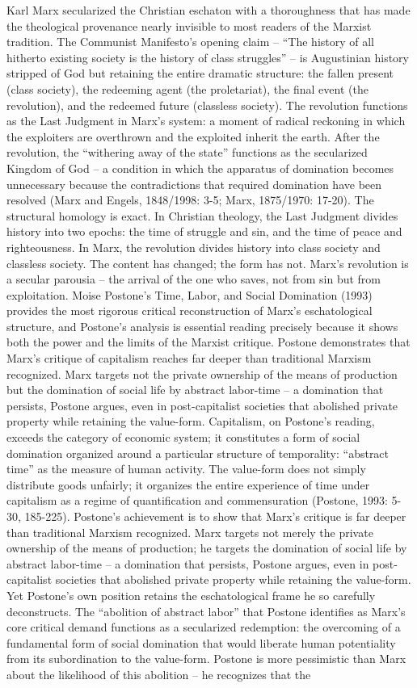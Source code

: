 Karl Marx secularized the Christian eschaton with a thoroughness that has made the theological provenance nearly invisible to most readers of the Marxist tradition. The Communist Manifesto’s opening claim – “The history of all hitherto existing society is the history of class struggles” – is Augustinian history stripped of God but retaining the entire dramatic structure: the fallen present (class society), the redeeming agent (the proletariat), the final event (the revolution), and the redeemed future (classless society). The revolution functions as the Last Judgment in Marx’s system: a moment of radical reckoning in which the exploiters are overthrown and the exploited inherit the earth. After the revolution, the “withering away of the state” functions as the secularized Kingdom of God – a condition in which the apparatus of domination becomes unnecessary because the contradictions that required domination have been resolved (Marx and Engels, 1848/1998: 3-5; Marx, 1875/1970: 17-20). The structural homology is exact. In Christian theology, the Last Judgment divides history into two epochs: the time of struggle and sin, and the time of peace and righteousness. In Marx, the revolution divides history into class society and classless society. The content has changed; the form has not. Marx’s revolution is a secular parousia – the arrival of the one who saves, not from sin but from exploitation. Moise Postone’s Time, Labor, and Social Domination (1993) provides the most rigorous critical reconstruction of Marx’s eschatological structure, and Postone’s analysis is essential reading precisely because it shows both the power and the limits of the Marxist critique. Postone demonstrates that Marx’s critique of capitalism reaches far deeper than traditional Marxism recognized. Marx targets not the private ownership of the means of production but the domination of social life by abstract labor-time – a domination that persists, Postone argues, even in post-capitalist societies that abolished private property while retaining the value-form. Capitalism, on Postone’s reading, exceeds the category of economic system; it constitutes a form of social domination organized around a particular structure of temporality: “abstract time” as the measure of human activity. The value-form does not simply distribute goods unfairly; it organizes the entire experience of time under capitalism as a regime of quantification and commensuration (Postone, 1993: 5-30, 185-225). Postone’s achievement is to show that Marx’s critique is far deeper than traditional Marxism recognized. Marx targets not merely the private ownership of the means of production; he targets the domination of social life by abstract labor-time – a domination that persists, Postone argues, even in post-capitalist societies that abolished private property while retaining the value-form. Yet Postone’s own position retains the eschatological frame he so carefully deconstructs. The “abolition of abstract labor” that Postone identifies as Marx’s core critical demand functions as a secularized redemption: the overcoming of a fundamental form of social domination that would liberate human potentiality from its subordination to the value-form. Postone is more pessimistic than Marx about the likelihood of this abolition – he recognizes that the 